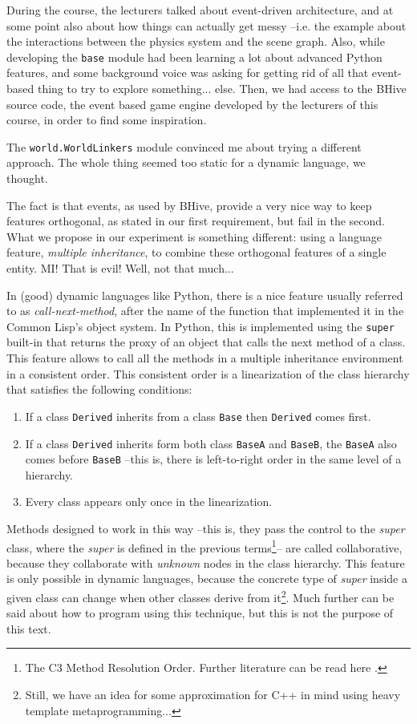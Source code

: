 \documentclass[a4paper,10pt]{article}
\begin{document}
During the course, the lecturers talked about event-driven
architecture, and at some point also about how things can actually get
messy --i.e. the example about the interactions between the physics
system and the scene graph. Also, while developing the \texttt{base}
module had been learning a lot about advanced Python features, and
some background voice was asking for getting rid of all that
event-based thing to try to explore something... else. Then, we had
access to the BHive source code, the event based game engine developed
by the lecturers of this course, in order to find some inspiration.

The \texttt{world.WorldLinkers} module convinced me about trying a
different approach. The whole thing seemed too static for a dynamic
language, we thought.

The fact is that events, as used by BHive, provide a very nice way to
keep features orthogonal, as stated in our first requirement, but fail
in the second. What we propose in our experiment is something
different: using a language feature, \emph{multiple inheritance}, to
combine these orthogonal features of a single entity. MI! That is
evil! Well, not that much...

In (good) dynamic languages like Python, there is a nice feature
usually referred to as \emph{call-next-method}, after the name of the
function that implemented it in the Common Lisp's object system. In
Python, this is implemented using the \texttt{super} built-in that
returns the proxy of an object that calls the next method of a
class. This feature allows to call all the methods in a multiple
inheritance environment in a consistent order. This consistent order
is a linearization of the class hierarchy that satisfies the following
conditions:

\begin{enumerate}
\item If a class \texttt{Derived} inherits from a class \texttt{Base}
  then \texttt{Derived} comes first.
\item If a class \texttt{Derived} inherits form both class
  \texttt{BaseA} and \texttt{BaseB}, the \texttt{BaseA} also comes
  before \texttt{BaseB} --this is, there is left-to-right order in
  the same level of a hierarchy.
\item Every class appears only once in the linearization.
\end{enumerate}

Methods designed to work in this way --this is, they pass the control
to the \emph{super} class, where the \emph{super} is defined in the
previous terms\footnote{The C3 Method Resolution Order. Further
  literature can be read here \cite{mro}.}-- are called collaborative,
because they collaborate with \emph{unknown} nodes in the class
hierarchy. This feature is only possible in dynamic languages, because
the concrete type of \emph{super} inside a given class can change when
other classes derive from it\footnote{Still, we have an idea for some
  approximation for C++ in mind using heavy template
  metaprogramming...}. Much further can be said about how to program
using this technique, but this is not the purpose of this text.
\end{document}
